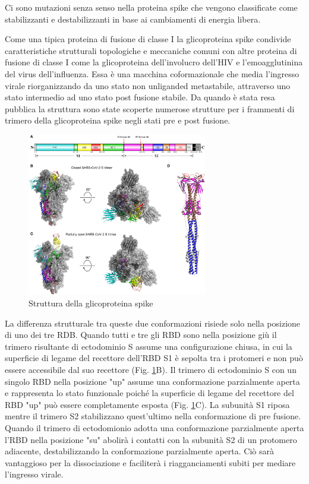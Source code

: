 Ci sono mutazioni senza senso nella proteina spike che vengono classificate come stabilizzanti e destabilizzanti in base ai cambiamenti di energia libera.

Come una tipica proteina di fusione di classe I la glicoproteina spike condivide caratteristiche strutturali topologiche e meccaniche comuni con altre proteina di fusione di classe I come la glicoproteina dell'involucro dell'HIV e l'emoagglutinina del virus dell'influenza. Essa è una macchina coformazionale che media l'ingresso virale riorganizzando da uno stato non unliganded metastabile, attraverso uno stato intermedio ad uno stato post fusione stabile. Da quando è stata resa pubblica la struttura sono state scoperte numerose strutture per i frammenti di trimero della glicoproteina spike negli stati pre e post fusione. 

\begin{figure}
	\centering
	\includegraphics[width=0.7\textwidth]{Immagini/Composizione_strutturale.png}
	\caption{Struttura della glicoproteina spike}
	\label{fig:StrutturaMassima}
\end{figure}

La differenza strutturale tra queste due conformazioni risiede solo nella posizione di uno dei tre RDB. Quando tutti e tre gli RBD sono nella posizione giù il trimero risultante di ectodominio S assume una configurazione chiusa, in cui la superficie di legame del recettore dell'RBD S1 è sepolta tra i protomeri e non può essere accessibile dal suo recettore (Fig. \ref{fig:StrutturaMassima}B). Il trimero di ectodominio S con un singolo RBD nella posizione "up" assume una conformazione parzialmente aperta e rappresenta lo stato funzionale poiché la superficie di legame del recettore del RBD "up" può essere completamente esposta (Fig. \ref{fig:StrutturaMassima}C). La subunità S1 riposa mentre il trimero S2 stabilizzano quest'ultimo nella conformazione di pre fusione. Quando il trimero di ectodomionio adotta una conformazione parzialmente aperta l'RBD nella posizione "su" abolirà i contatti con la subunità S2 di un protomero adiacente, destabilizzando la conformazione parzialmente aperta. Ciò sarà vantaggioso per la dissociazione e faciliterà i riagganciamenti subiti per mediare l'ingresso virale. 

